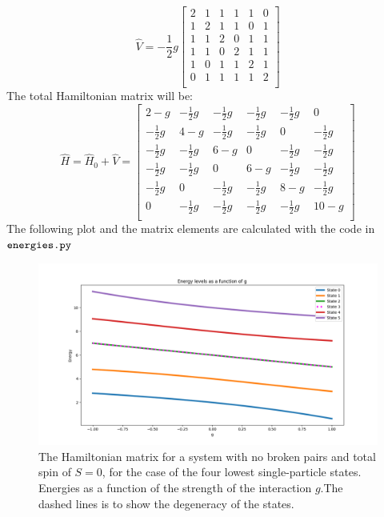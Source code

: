\documentclass[a4paper,12pt]{article}
\begin{document}
$$
\hat{V} = -\frac{1}{2}g
\begin{bmatrix}
    2 & 1 & 1 & 1 & 1 & 0 \\
    1 & 2 & 1 & 1 & 0 & 1 \\
    1 & 1 & 2 & 0 & 1 & 1 \\
    1 & 1 & 0 & 2 & 1 & 1 \\
    1 & 0 & 1 & 1 & 2 & 1 \\
    0 & 1 & 1 & 1 & 1 & 2 \\
    \end{bmatrix}
$$
The total Hamiltonian matrix will be:
$$
\hat{H} = \hat{H}_0 + \hat{V} = 
\begin{bmatrix}
    2 - g & -\frac{1}{2}g & -\frac{1}{2}g & -\frac{1}{2}g & -\frac{1}{2}g & 0 \\
    -\frac{1}{2}g & 4 - g & -\frac{1}{2}g & -\frac{1}{2}g & 0 & -\frac{1}{2}g \\
    -\frac{1}{2}g & -\frac{1}{2}g & 6 - g & 0 & -\frac{1}{2}g & -\frac{1}{2}g \\
    -\frac{1}{2}g & -\frac{1}{2}g & 0 & 6 - g & -\frac{1}{2}g & -\frac{1}{2}g \\
    -\frac{1}{2}g & 0 & -\frac{1}{2}g & -\frac{1}{2}g & 8 - g & -\frac{1}{2}g \\
    0 & -\frac{1}{2}g & -\frac{1}{2}g & -\frac{1}{2}g & -\frac{1}{2}g & 10 - g \\
\end{bmatrix}
$$
The following plot and the matrix elements are calculated with the code in $ \verb|energies.py|$
\begin{figure}[h]
    \centering
    \includegraphics[scale = 0.5]{Figure_1.png}
    \caption{The Hamiltonian matrix for a system with no broken pairs and total spin of $S=0$, for the case of the four lowest single-particle states. Energies as a function of the strength of the interaction $g$.The dashed lines is to show the degeneracy of the states.}
\end{figure}
\end{document}
